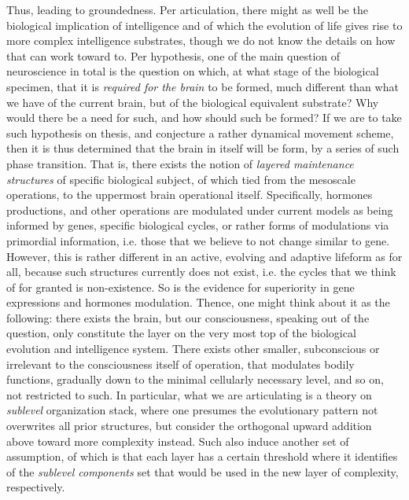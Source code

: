Thus, leading to groundedness. Per articulation, there might as well be the biological implication of intelligence and of which the evolution of life gives rise to more complex intelligence substrates, though we do not know the details on how that can work toward to. Per hypothesis, one of the main question of neuroscience in total is the question on which, at what stage of the biological specimen, that it is \textit{required for the brain} to be formed, much different than what we have of the current brain, but of the biological equivalent substrate? Why would there be a need for such, and how should such be formed? If we are to take such hypothesis on thesis, and conjecture a rather dynamical movement scheme, then it is thus determined that the brain in itself will be form, by a series of such phase transition. That is, there exists the notion of \textit{layered maintenance structures} of specific biological subject, of which tied from the mesoscale operations, to the uppermost brain operational itself. Specifically, hormones productions, and other operations are modulated under current models as being informed by genes, specific biological cycles, or rather forms of modulations via primordial information, i.e. those that we believe to not change similar to gene. However, this is rather different in an active, evolving and adaptive lifeform as for all, because such structures currently does not exist, i.e. the cycles that we think of for granted is non-existence. So is the evidence for superiority in gene expressions and hormones modulation. Thence, one might think about it as the following: there exists the brain, but our consciousness, speaking out of the question, only constitute the layer on the very most top of the biological evolution and intelligence system. There exists other smaller, subconscious or irrelevant to the consciousness itself of operation, that modulates bodily functions, gradually down to the minimal cellularly necessary level, and so on, not restricted to such. In particular, what we are articulating is a theory on \textit{sublevel} organization stack, where one presumes the evolutionary pattern not overwrites all prior structures, but consider the orthogonal upward addition above toward more complexity instead. Such also induce another set of assumption, of which is that each layer has a certain threshold where it identifies of the \textit{sublevel components} set that would be used in the new layer of complexity, respectively. 

